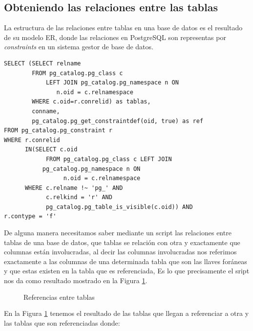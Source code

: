 \subsection{Obteniendo las relaciones entre las tablas}
La estructura de las relaciones entre tablas en una base de datos es el resultado de su modelo ER, donde las relaciones en PostgreSQL son representas por \textit{constraints} en un sistema gestor de base de datos.
\lstset{language=sql,breaklines=false}
\label{SQL Tablas que referencian}
\begin{lstlisting}
SELECT (SELECT relname
        FROM pg_catalog.pg_class c
        	LEFT JOIN pg_catalog.pg_namespace n ON
		       n.oid = c.relnamespace
        WHERE c.oid=r.conrelid) as tablas,
        conname,
        pg_catalog.pg_get_constraintdef(oid, true) as ref 
FROM pg_catalog.pg_constraint r 
WHERE r.conrelid 
	  IN(SELECT c.oid 
		    FROM pg_catalog.pg_class c LEFT JOIN
           pg_catalog.pg_namespace n ON 
		         n.oid = c.relnamespace 
      WHERE c.relname !~ 'pg_' AND 
            c.relkind = 'r' AND 
            pg_catalog.pg_table_is_visible(c.oid)) AND 
r.contype = 'f'
\end{lstlisting}
De alguna manera necesitamos saber mediante un script las relaciones entre tablas de una base de datos, que tablas se relaci\'on con otra y exactamente que columnas est\'an involucradas, al decir las columnas involucradas nos referimos exactamente a las columnas de una determinada tabla que son las llaves for\'aneas y que estas existen en la tabla que es referenciada, Es lo que precisamente el sript nos da como resultado mostrado en la Figura \ref{fig:Referencias entre tablas}.
\begin{figure}[H]
\centering
{}
\caption{Referencias entre tablas} \label{fig:Referencias entre tablas}
\end{figure}
En la Figura \ref{fig:Referencias entre tablas} tenemos el resultado de las tablas que llegan a referenciar a otra y las tablas que son referenciadas donde:
